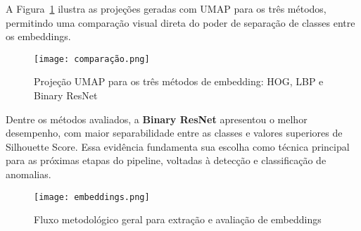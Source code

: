 \documentclass[12pt]{article}
\begin{document}
A Figura~\ref{fig:umap_comparacao} ilustra as projeções geradas com UMAP para os três métodos, permitindo uma comparação visual direta do poder de separação de classes entre os embeddings.

\begin{figure}[H]
\centering
\texttt{[image: comparação.png]}
\caption{Projeção UMAP para os três métodos de embedding: HOG, LBP e Binary ResNet}
\label{fig:umap_comparacao}
\end{figure}

Dentre os métodos avaliados, a \textbf{Binary ResNet} apresentou o melhor desempenho, com maior separabilidade entre as classes e valores superiores de Silhouette Score. Essa evidência fundamenta sua escolha como técnica principal para as próximas etapas do pipeline, voltadas à detecção e classificação de anomalias.

\begin{figure}[H]
\centering
\texttt{[image: embeddings.png]}
\caption{Fluxo metodológico geral para extração e avaliação de embeddings}
\label{fig:infografico_pipeline}
\end{figure}


\vspace{2cm}
\newpage


\end{document}
